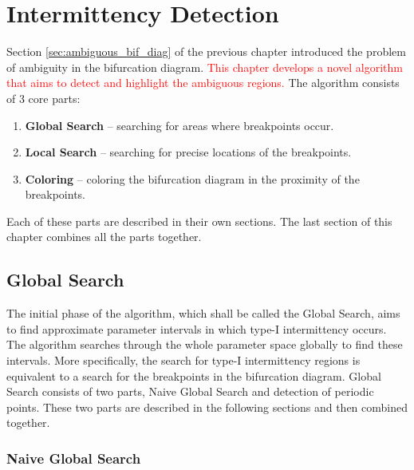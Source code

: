 \chapter{Intermittency Detection}
\label{chapter:intdetection}
Section \ref{sec:ambiguous_bif_diag} of the previous chapter introduced the problem of ambiguity in the bifurcation diagram.
\textcolor{red}{This chapter develops a novel algorithm that aims to detect and highlight the ambiguous regions.}
The algorithm consists of 3 core parts:

\begin{enumerate}
	\item \textbf{Global Search} -- searching for areas where breakpoints occur.
	\item \textbf{Local Search} -- searching for precise locations of the breakpoints.
	\item \textbf{Coloring} -- coloring the bifurcation diagram in the proximity of the breakpoints.
\end{enumerate}

Each of these parts are described in their own sections.
The last section of this chapter combines all the parts together.

\section{Global Search}
\label{sec:globsearch}
The initial phase of the algorithm, which shall be called the Global Search, aims to find approximate parameter intervals in which type-I intermittency occurs.
The algorithm searches through the whole parameter space globally to find these intervals.
More specifically, the search for type-I intermittency regions is equivalent to a search for the breakpoints in the bifurcation diagram.
Global Search consists of two parts, Naive Global Search and detection of periodic points.
These two parts are described in the following sections and then combined together.
\subsection{Naive Global Search}

